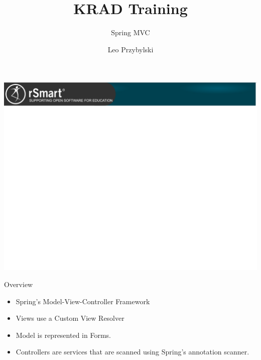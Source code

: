 \documentclass[xcolor=dvipsnames,14pt,professionalfonts]{beamer}
\begin{document}
\title{KRAD Training}
\subtitle{Spring MVC}
\author[Leo]{Leo Przybylski}

\usebackgroundtemplate%
{%
    \includegraphics[width=\paperwidth,height=\paperheight]{../img/header.png}%
}

{
%
\begin{frame}[plain]
  \titlepage
\end{frame}
}

\begin{frame}{Overview}
  \begin{itemize}
  \item Spring's Model-View-Controller Framework
  \item Views use a Custom View Resolver
  \item Model is represented in Forms.
  \item Controllers are services that are scanned using Spring's
    annotation scanner.
  \end{itemize}
\end{frame}
\end{document}
